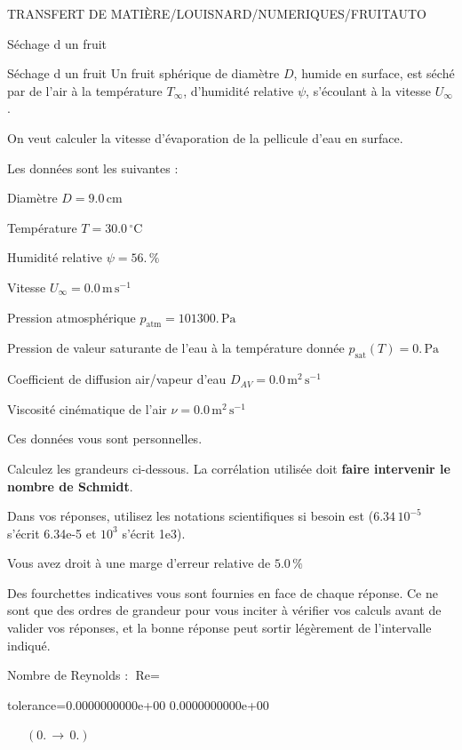 \documentclass[12pt]{article}
\begin{document}
\begin{quiz}{TRANSFERT DE MATIÈRE/LOUISNARD/NUMERIQUES/FRUITAUTO}
\begin{cloze}{Séchage d un fruit}
\end{cloze} 


 \begin{cloze}{Séchage d un fruit} 
Un fruit sphérique de diamètre $D$, humide en surface, est séché par de l'air à la température $T_\infty$, d'humidité relative $\psi$, s'écoulant à la vitesse $U_\infty$.

On veut calculer la vitesse d'évaporation de la pellicule d'eau en surface.

 

Les données sont les suivantes :

 

Diamètre $D = 9.0\,  \mathrm{cm} $

Température $T = 30.0\,  \mathrm{^\circ\mathrm{C}} $

Humidité relative $\psi = 56.\, \% $

Vitesse $U_\infty = 0.0\,  \mathrm{m}\,  \mathrm{s}^{-1} $

Pression atmosphérique $p_{\text{atm}} = 101300.\,  \mathrm{Pa} $

Pression de valeur saturante de l’eau à la température donnée $p_{\text{sat}}(T) = 0.\,  \mathrm{Pa} $

Coefficient de diffusion air/vapeur d’eau $D_{AV} = 0.0\,  \mathrm{m}^{2}\,  \mathrm{s}^{-1} $

Viscosité cinématique de l’air $\nu = 0.0\,  \mathrm{m}^{2}\,  \mathrm{s}^{-1} $

Ces données vous sont personnelles.

 

Calculez les grandeurs ci-dessous. La corrélation utilisée doit \textbf{faire intervenir le nombre de Schmidt}.

Dans vos réponses, utilisez les notations scientifiques si besoin est ($6.34\, 10^{-5}$ s'écrit 6.34e-5 et $10^{3}$ s'écrit 1e3).

Vous avez droit à une marge d'erreur relative de $5.0\, \% $

Des fourchettes indicatives vous sont fournies en face de chaque réponse. Ce ne sont que des ordres de grandeur pour vous inciter à vérifier vos calculs avant de valider vos réponses, et la bonne réponse peut sortir légèrement de l'intervalle indiqué.

 

Nombre de Reynolds : $\text{Re} =  $
\begin{numerical}[points=1] 
\item[tolerance={0.0000000000e+00}] 0.0000000000e+00 
\end{numerical} 
 $\,$ 
 $ \quad (0. \, \rightarrow \, 0.) $ 


\end{cloze}
\end{quiz}
\end{document}
